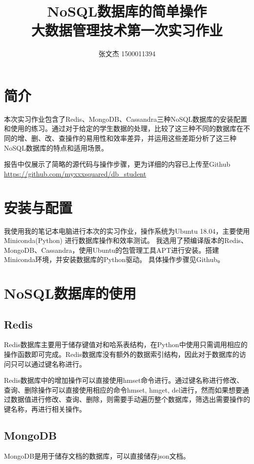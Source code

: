 \documentclass[12pt]{ctexart}
\title{NoSQL数据库的简单操作\\{\Large 大数据管理技术第一次实习作业}}
\author{张文杰 1500011394}
\begin{document}
\maketitle

\section{简介}

本次实习作业包含了Redis、MongoDB、Cassandra三种NoSQL数据库的安装配置和使用的练习。通过对于给定的学生数据的处理，比较了这三种不同的数据库在不同的增、删、改、查操作的易用性和效率差异，并运用这些差距分析了这三种NoSQL数据库的特点和适用场景。

报告中仅展示了简略的源代码与操作步骤，更为详细的内容已上传至Github \url{https://github.com/myxxxsquared/db_student}

\section{安装与配置}

我使用我的笔记本电脑进行本次的实习作业，操作系统为Ubuntu 18.04，主要使用 Miniconda(Python) 进行数据库操作和效率测试。
我选用了预编译版本的Redis、MongoDB、Cassandra，使用Ubuntu的包管理工具APT进行安装。搭建Miniconda环境，并安装数据库的Python驱动。
具体操作步骤见Github。

\section{NoSQL数据库的使用}

\subsection{Redis}

Redis数据库主要用于储存键值对和哈系表结构，在Python中使用只需调用相应的操作函数即可完成。Redis数据库没有额外的数据索引结构，因此对于数据库的访问只可以通过键名称进行。

Redis数据库中的增加操作可以直接使用hmset命令进行。通过键名称进行修改、查询、删除操作可以直接使用相应的命令hmset, hmget, del进行，然而如果想要通过数据值进行修改、查询、删除，则需要手动遍历整个数据库，筛选出需要操作的键名称，再进行相关操作。

\subsection{MongoDB}

MongoDB是用于储存文档的数据库，可以直接储存json文档。
\end{document}
